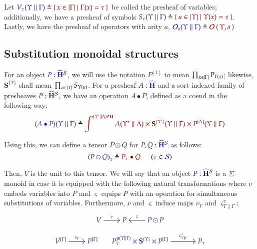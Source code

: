 \documentclass[11pt]{article}
\theoremstyle{definition}
\theoremstyle{remark}
\numberwithin{equation}{section}
\newcommand\HypCat{\mathbf{H}}
\begin{document}
Let $\Define{V_\tau(\Upsilon\parallel\Gamma)}{\MkSet{x\in\Dom\Gamma\mid
    \Gamma(x)=\tau}}$ be called the presheaf of variables; additionally, we have
a presheaf of symbols
$\Define{S_\tau(\Upsilon\parallel\Gamma)}{\MkSet{u\in\Dom\Upsilon\mid
    \Upsilon(x)=\tau}}$. Lastly, we have the presheaf of operators with arity
$a$,
$\Define{\Operators_a(\Upsilon\parallel\Gamma)}{\Operators\Pair{\Upsilon}{a}}$

\subsection{Substitution monoidal structures}
\newcommand\SymPsh{\mathbf{S}}
\newcommand\VarPsh{\mathbf{V}}

For an object $\Of{P}{\widehat{\HypCat}^\Sorts}$, we will use the notation
$P^{[\Gamma]}$ to mean $\prod_{x\in\left\vert\Gamma\right\vert}P_{\Gamma(x)}$; likewise,
$\SymPsh^{\{\Upsilon\}}$ shall mean $\prod_{u\in\left\vert\Upsilon\right\vert}S_{\Upsilon(u)}$. For a
presheaf $\Of{A}{\widehat{\HypCat}}$ and a sort-indexed family of presheaves
$\Of{P}{\widehat{\HypCat}^\Sorts}$, we have an operation $A\bullet P$, defined
as a coend in the following way:
\[
  \Define{(A\bullet P)(\Upsilon\parallel\Gamma)}{
    \int^{(\Upsilon'\parallel\Delta)\in\HypCat}
      A(\Upsilon'\parallel\Delta)
      \times \SymPsh^{\{\Upsilon'\}}(\Upsilon\parallel\Gamma)
      \times P^{[\Delta]}(\Upsilon\parallel\Gamma)
  }
\]

Using this, we can define a tensor $P\odot Q$ for
$\Of{P,Q}{\widehat{\HypCat}^\Sorts}$ as follows:
\[
  \HypJ{
    \Define{{(P\odot Q)}_{\tau}}{
      P_\tau\bullet Q
    }
\quad
  }{
    \Member{\tau}{\Sorts}
  }
\]

Then, $V$ is the unit to this tensor. We will say that an object
$\Of{P}{\widehat{\HypCat}^\Sorts}$ is a $\Sigma$-monoid in case it is equipped
with the following natural transformations where $\nu$ embeds variables into $P$
and $\varsigma$ equips $P$ with an operation for simultaneous substitutions of
variables. Furthermore, $\nu$ and $\varsigma$ induce maps ${\nu}_{\Gamma}$ and
${\varsigma}^{\tau}_{\Upsilon\parallel\Gamma}$:
\begin{gather*}
  \begin{tikzcd}[cramped, ampersand replacement = \&]
    {\IMode{V}} \arrow[r, "\IMode\nu"]
    \&
    {\IMode{P}}
    \&
    {\IMode{P\odot P}}
      \arrow[l, swap, "\IMode\varsigma"]
  \end{tikzcd}\\[6pt]
  \begin{tikzcd}[cramped, ampersand replacement = \&]
    {\IMode{{V}^{[\Gamma]}}}
      \arrow[r, "\IMode{{\nu}_{\Gamma}}"]
    \&
    {\IMode{{P}^{[\Gamma]}}}
  \end{tikzcd}
  \qquad
  \begin{tikzcd}[cramped, sep = large, ampersand replacement = \&]
    {\IMode{{P_\tau^{\Yoneda{\Upsilon\parallel\Gamma}}\times \SymPsh^{\{\Upsilon\}}\times P^{[\Gamma]}}}}
      \arrow[r, "\IMode{\varsigma^\tau_{\Upsilon\parallel\Gamma}}"]
    \&
    {\IMode{P_\tau}}
  \end{tikzcd}
\end{gather*}
\end{document}
